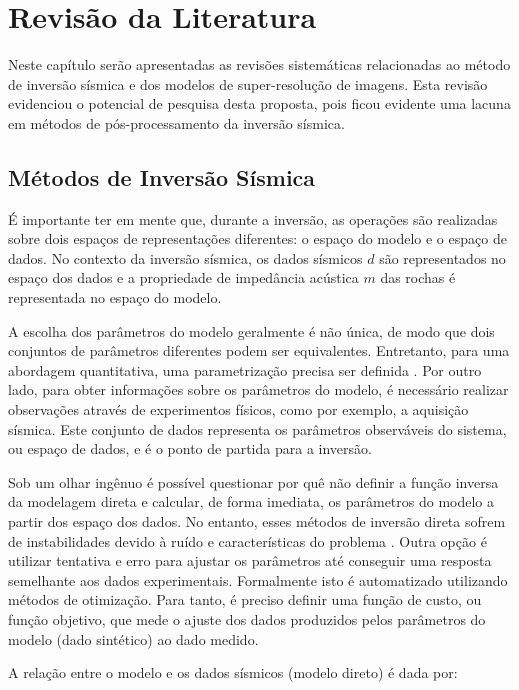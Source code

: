 \chapter{Revisão da Literatura}
\label{cap:3revisaoliteraria}

Neste capítulo serão apresentadas as revisões sistemáticas relacionadas
ao método de inversão sísmica e dos modelos de super-resolução de imagens.
Esta revisão evidenciou o potencial de pesquisa desta proposta, pois
ficou evidente uma lacuna em métodos de pós-processamento da inversão sísmica.

\section{Métodos de Inversão Sísmica}
É importante ter em mente que, durante a inversão, as operações são realizadas
sobre dois espaços de representações diferentes: o espaço do modelo e o espaço de dados.
No contexto da inversão sísmica, os dados sísmicos $d$ são representados no espaço
dos dados e a propriedade de impedância acústica $m$ das rochas é representada
no espaço do modelo.

A escolha dos parâmetros do modelo geralmente é não única, de modo que dois conjuntos
de parâmetros diferentes podem ser equivalentes.
Entretanto, para uma abordagem quantitativa, uma parametrização precisa ser definida \cite{tarantola}.
Por outro lado, para obter informações sobre os parâmetros do modelo, é necessário
realizar observações através de experimentos físicos, como por exemplo, a
aquisição sísmica. Este conjunto de dados representa os parâmetros observáveis do sistema,
ou espaço de dados, e é o ponto de partida para a inversão.

Sob um olhar ingênuo é possível questionar por quê não definir a
função inversa da modelagem direta e calcular, de forma imediata,
os parâmetros do modelo a partir dos espaço dos dados.
No entanto, esses métodos de inversão direta sofrem de instabilidades
devido à ruído e características do problema \citep[p. 50]{sen_livro}. Outra
opção é utilizar tentativa e erro para ajustar os parâmetros até conseguir uma
resposta semelhante aos dados experimentais. Formalmente isto é automatizado
utilizando métodos de otimização. Para tanto, é preciso definir uma função de
custo, ou função objetivo, que mede o ajuste dos dados produzidos pelos
parâmetros do modelo (dado sintético) ao dado medido.

A relação entre o modelo e os dados sísmicos (modelo direto) é dada por:

